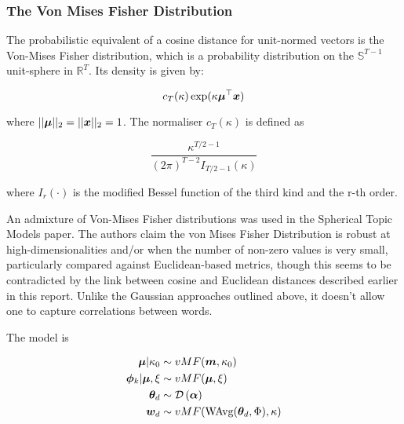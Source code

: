 \subsubsection{The Von Mises Fisher Distribution}

The probabilistic equivalent of a cosine distance for unit-normed vectors is the Von-Mises Fisher distribution, which is a probability distribution on the $\mathbb{S}^{T-1}$ unit-sphere in $\mathbb{R}^{T}$. Its density is given by:

\begin{equation}
c_T(\kappa)\exp(\kappa \bm \mu^\top\bm x)
\end{equation}

where $||\bm \mu||_2 = ||\bm x||_2 = 1$. The normaliser $c_T(\kappa)$ is defined as

\begin{equation}
\frac{\kappa ^{T\!/\!2-1}}{(2\pi)^{T-2} I_{T\!/\!2-1}(\kappa)}
\end{equation}

where $I_r(\cdot)$ is the modified Bessel function of the third kind and the r-th order.


An admixture of Von-Mises Fisher distributions was used in the Spherical Topic Models paper\cite{Reisinger2010}. The authors claim the von Mises Fisher Distribution is robust at high-dimensionalities and/or when the number of non-zero values is very small, particularly compared against Euclidean-based metrics, though this seems to be contradicted by the link between cosine and Euclidean distances described earlier in this report. Unlike the Gaussian approaches outlined above, it doesn't allow one to capture correlations between words.

The model is

\begin{align}
\bm \mu | \kappa_0 & \sim  vMF(\bm m, \kappa_0) \\
\bm \phi_k | \bm \mu, \xi & \sim  vMF(\bm \mu, \xi) \\
{ \bm \theta_d } & \sim  \mathcal{D} \left( {\bm \alpha} \right) \\
{ \bm w_d } & \sim  vMF(\text{WAvg}({ \bm \theta_d }, \Phi), \kappa) 
\end{align}

